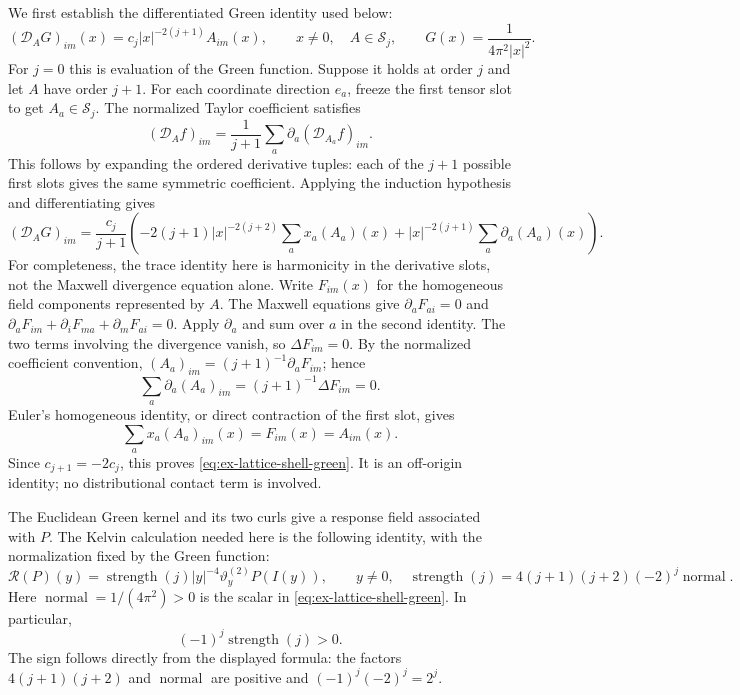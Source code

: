 We first establish the differentiated Green identity used below:
\begin{equation}\label{eq:ex-lattice-shell-green}
 (\mathcal D_A G)_{im}(x)=c_j|x|^{-2(j+1)}A_{im}(x),\qquad x\ne0,
 \quad A\in\mathscr S_j,
 \qquad G(x)=\frac{1}{4\pi^2|x|^2}.
\end{equation}
For $j=0$ this is evaluation of the Green function. Suppose it holds at
order $j$ and let $A$ have order $j+1$. For each coordinate direction
$e_a$, freeze the first tensor slot to get $A_a\in\mathscr S_j$. The
normalized Taylor coefficient satisfies
\[
 (\mathcal D_A f)_{im}=\frac1{j+1}\sum_a\partial_a(\mathcal D_{A_a}f)_{im}.
\]
This follows by expanding the ordered derivative tuples: each of the
$j+1$ possible first slots gives the same symmetric coefficient. Applying
the induction hypothesis and differentiating gives
\[
 (\mathcal D_A G)_{im}=\frac{c_j}{j+1}\left(
  -2(j+1)|x|^{-2(j+2)}\sum_a x_a(A_a)(x)
  +|x|^{-2(j+1)}\sum_a\partial_a(A_a)(x)\right).
\]
For completeness, the trace identity here is harmonicity in the derivative
slots, not the Maxwell divergence equation alone. Write $F_{im}(x)$ for
the homogeneous field components represented by $A$. The Maxwell equations
give $\partial_aF_{ai}=0$ and
$\partial_aF_{im}+\partial_iF_{ma}+\partial_mF_{ai}=0$. Apply $\partial_a$
and sum over $a$ in the second identity. The two terms involving the
divergence vanish, so $\Delta F_{im}=0$. By the normalized coefficient
convention, $(A_a)_{im}=(j+1)^{-1}\partial_aF_{im}$; hence
\[
 \sum_a\partial_a(A_a)_{im}
   =(j+1)^{-1}\Delta F_{im}=0.
\]
Euler's homogeneous identity, or direct contraction of the first slot,
gives
\[
 \sum_a x_a(A_a)_{im}(x)=F_{im}(x)=A_{im}(x).
\]
Since $c_{j+1}=-2c_j$, this proves
\eqref{eq:ex-lattice-shell-green}. It is an off-origin identity; no
distributional contact term is involved.

The Euclidean Green kernel and its two curls give a response field
associated with $P$. The Kelvin calculation needed here is the following
identity, with the normalization fixed by the Green function:
\begin{equation}\label{eq:ex-lattice-kelvin-response}
 \mathcal R(P)(y)
 =\operatorname{strength}(j)|y|^{-4}
   \vartheta_y^{(2)}P(I(y)),\qquad y\ne0,
 \quad\operatorname{strength}(j)
 =4(j+1)(j+2)(-2)^j\operatorname{normal}.
\end{equation}
Here $\operatorname{normal}=1/(4\pi^2)>0$ is the scalar in
\eqref{eq:ex-lattice-shell-green}. In particular,
\begin{equation}\label{eq:ex-lattice-strength-sign}
 (-1)^j\operatorname{strength}(j)>0.
\end{equation}
The sign follows directly from the displayed formula: the factors
$4(j+1)(j+2)$ and $\operatorname{normal}$ are positive and
$(-1)^j(-2)^j=2^j$.


